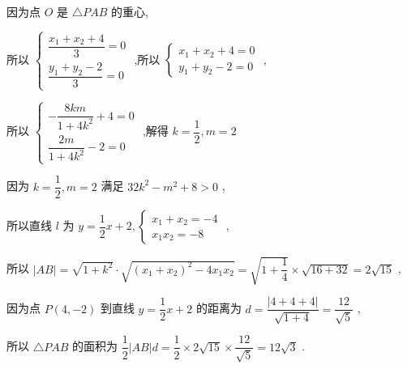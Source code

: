 \begin{enumerate}
\begin{jieda}
\begin{enumerate}
        因为点 $O$ 是 $\bigtriangleup  {PAB}$ 的重心,
        
        所以 $\left\{  \begin{array}{l} \dfrac{{x}_{1} + {x}_{2} + 4}{3} = 0 \\  \dfrac{{y}_{1} + {y}_{2} - 2}{3} = 0 \end{array}\right.$ ,所以 $\left\{  \begin{array}{l} {x}_{1} + {x}_{2} + 4 = 0 \\  {y}_{1} + {y}_{2} - 2 = 0 \end{array}\right.$ ,
        
        所以 $\left\{  \begin{array}{l}  - \dfrac{8km}{1 + 4{k}^{2}} + 4 = 0 \\  \dfrac{2m}{1 + 4{k}^{2}} - 2 = 0 \end{array}\right.$ ,解得 $k = \dfrac{1}{2},m = 2$
        
        因为 $k = \dfrac{1}{2},m = 2$ 满足 ${32}{k}^{2} - {m}^{2} + 8 > 0$ ,
        
        所以直线 $l$ 为 $y = \dfrac{1}{2}x + 2,\left\{  \begin{array}{l} {x}_{1} + {x}_{2} =  - 4 \\  {x}_{1}{x}_{2} =  - 8 \end{array}\right.$ ,
        
        所以 $\left| {AB}\right|  = \sqrt{1 + {k}^{2}} \cdot  \sqrt{{\left( {x}_{1} + {x}_{2}\right) }^{2} - 4{x}_{1}{x}_{2}} = \sqrt{1 + \dfrac{1}{4}} \times  \sqrt{{16} + {32}} = 2\sqrt{15}$ ,
        
        因为点 $P\left( {4, - 2}\right)$ 到直线 $y = \dfrac{1}{2}x + 2$ 的距离为 $d = \dfrac{\left| 4 + 4 + 4\right| }{\sqrt{1 + 4}} = \dfrac{12}{\sqrt{5}}$ ,
        
        所以 $\bigtriangleup {PAB}$ 的面积为 $\dfrac{1}{2}\left| {AB}\right| d = \dfrac{1}{2} \times  2\sqrt{15} \times  \dfrac{12}{\sqrt{5}} = {12}\sqrt{3}$ .
        

\end{enumerate}
\end{jieda}
\end{enumerate}
